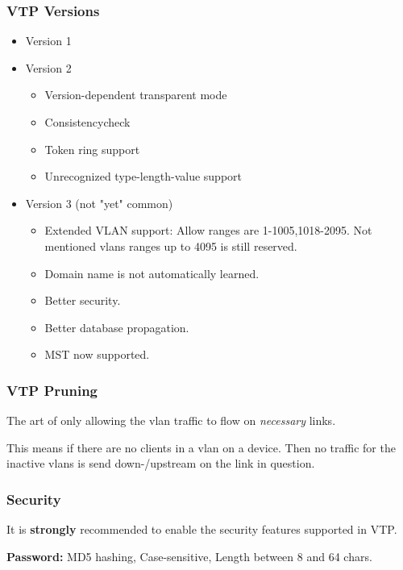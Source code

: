 \documentclass[a4paper,12pt,twoside,twocolumn]{book}
\begin{document}
\subsubsection{VTP Versions}
\begin{itemize}
    \item Version 1
    \item Version 2
    \begin{itemize}
        \item Version-dependent	transparent	mode
        \item Consistencycheck
        \item Token ring support
        \item Unrecognized type-length-value support
    \end{itemize}
    \item Version 3 (not "yet" common)
    \begin{itemize}
        \item Extended VLAN support: Allow ranges are 1-1005,1018-2095. Not mentioned vlans ranges up to 4095 is still reserved.
        \item Domain name is not automatically learned.
        \item Better security.
        \item Better database propagation.
        \item MST now supported.
    \end{itemize}
\end{itemize}

\subsubsection{VTP Pruning}
The art of only allowing the vlan traffic to flow on \textit{necessary} links.

This means if there are no clients in a vlan on a device. Then no traffic for the inactive vlans is send down-/upstream on the link in question.

\subsubsection{Security}
It is \textbf{strongly} recommended to enable the security features supported in VTP.

\textbf{Password:} MD5 hashing, Case-sensitive, Length between 8 and 64 chars.

\end{document}
